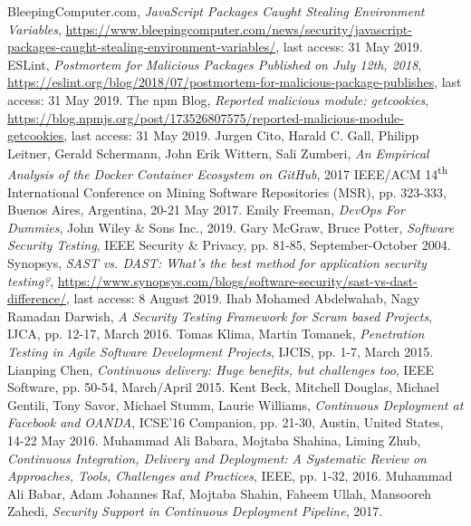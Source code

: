 \documentclass{article} %
\begin{document}
\begin{thebibliography}{9}
BleepingComputer.com, \emph{JavaScript Packages Caught Stealing Environment Variables}, \url{https://www.bleepingcomputer.com/news/security/javascript-packages-caught-stealing-environment-variables/}, last access: 31 May 2019.
ESLint, \emph{Postmortem for Malicious Packages Published on July 12th, 2018}, \url{https://eslint.org/blog/2018/07/postmortem-for-malicious-package-publishes}, last access: 31 May 2019.
The npm Blog, \emph{Reported malicious module: getcookies}, \url{https://blog.npmjs.org/post/173526807575/reported-malicious-module-getcookies}, last access: 31 May 2019.
Jurgen Cito, Harald C. Gall, Philipp Leitner, Gerald Schermann, John Erik Wittern, Sali Zumberi, \emph{An Empirical Analysis of the
Docker Container Ecosystem on GitHub}, 2017 IEEE/ACM 14\textsuperscript{th} International Conference on Mining Software Repositories (MSR), pp. 323-333, Buenos Aires, Argentina, 20-21 May 2017.
Emily Freeman, \emph{DevOps For Dummies}, John Wiley \& Sons Inc., 2019.
Gary McGraw, Bruce Potter, \emph{Software Security Testing}, IEEE Security \& Privacy, pp. 81-85, September-October 2004.
Synopsys, \emph{SAST vs. DAST: What’s the best method for application security testing?}, \url{https://www.synopsys.com/blogs/software-security/sast-vs-dast-difference/}, last access: 8 August 2019.
Ihab Mohamed Abdelwahab, Nagy Ramadan Darwish, \emph{A Security Testing Framework for Scrum based Projects}, IJCA, pp. 12-17, March 2016.
Tomas Klima, Martin Tomanek, \emph{Penetration Testing in Agile Software Development Projects}, IJCIS, pp. 1-7, March 2015.
Lianping Chen, \emph{Continuous delivery: Huge benefits, but challenges too}, IEEE Software, pp. 50-54, March/April 2015.
Kent Beck, Mitchell Douglas, Michael Gentili, Tony Savor, Michael Stumm, Laurie Williams, \emph{Continuous Deployment at Facebook and OANDA}, ICSE'16 Companion, pp. 21-30, Austin, United States, 14-22 May 2016.
Muhammad Ali Babara, Mojtaba Shahina, Liming Zhub, \emph{Continuous Integration, Delivery and Deployment: A Systematic Review on Approaches, Tools, Challenges and Practices}, IEEE, pp. 1-32, 2016.
Muhammad Ali Babar, Adam Johannes Raf, Mojtaba Shahin, Faheem Ullah, Mansooreh Zahedi, \emph{Security Support in Continuous Deployment Pipeline}, 2017.

\end{thebibliography}
\end{document}

